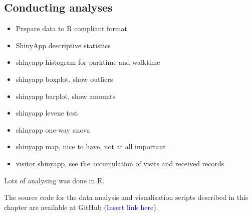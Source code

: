 \subsection{Conducting analyses}
\begin{itemize}
    \item Prepare data to R compliant format
    \item ShinyApp descriptive statistics
    \item shinyapp histogram for parktime and walktime
    \item shinyapp boxplot, show outliers
    \item shinyapp barplot, show amounts
    \item shinyapp levene test
    \item shinyapp one-way anova
    \item shinyapp map, nice to have, not at all important
    \item visitor shinyapp, see the accumulation of visits and received records
\end{itemize}
\justify
Lots of analysing was done in R. 

The source code for the data analysis and visualisation scripts described in this chapter are available at GitHub (\textcolor{blue}{Insert link here}).